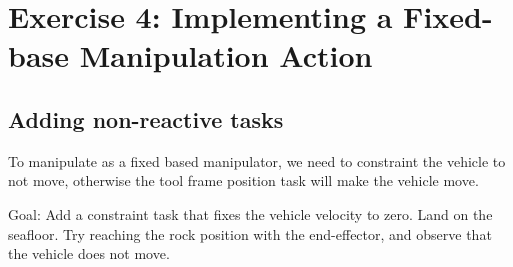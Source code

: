 \documentclass{article}
\begin{document}
\section{Exercise 4: Implementing a Fixed-base Manipulation Action}
\subsection{Adding non-reactive tasks}
To manipulate as a fixed based manipulator, we need to constraint the vehicle to not move, otherwise the tool frame position task will make the vehicle move.

Goal: Add a constraint task that fixes the vehicle velocity to zero. Land on the seafloor. Try reaching the rock position with the end-effector, and observe that the vehicle does not move.

\begin{figure}[H]
	\centering
	\hspace{10mm}
	\label{fig:ex4.1.1Mission}
\end{figure}
\end{document}
